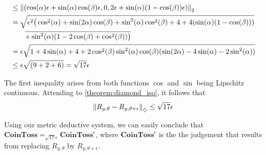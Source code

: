 \begin{example} 
\begin{align*}
  &  \leq \left\lVert ( \cos(\alpha)\epsilon + \sin(\alpha)\cos(\beta) \epsilon, 0, 2\epsilon + \sin(\alpha)(1-\cos(\beta))\epsilon) \right\rVert_{2} \\
  & = \sqrt{\epsilon^2\big(\cos^2(\alpha) +\sin(2\alpha)\cos(\beta) +  \sin^2(\alpha)\cos^2(\beta)+ 4 + 4 (\sin(\alpha) (1-\cos(\beta))) } \\
  & \hspace{20pt} \overline{ + \sin^2(\alpha) (1 - 2\cos(\beta)+ \cos^2(\beta))\big)} \\
  &= \epsilon \sqrt{ 1 + 4 \sin(\alpha)+4+ 2 \cos^2(\beta) \sin^2(\alpha) \cos(\beta)(\sin(2\alpha)-4\sin(\alpha)-2\sin^2(\alpha))} \\
  & \leq \epsilon \sqrt{(9+2+6 )} = \sqrt{17}  \epsilon
\end{align*}

The first inequality arises from both functions $\cos$ and $\sin$ being Lipschitz continuous. Attending to \autoref{theorem:diamond_iso}, it follows that
  \begin{align*}
    \left\lVert R_{y, \theta}- R_{y, \theta + \epsilon}  \right\rVert_{\diamondsuit} \leq \sqrt{17} \epsilon
  \end{align*}

Using our metric deductive system, we can easily conclude that $\textbf{CoinToss} =_{\sqrt{17}  \epsilon} \textbf{CoinToss}^{\epsilon}$, where $\textbf{CoinToss}^{\epsilon}$ is the the judgement that results from replacing $R_{y, \theta}$ by $R_{y, \theta + \epsilon}$.

\end{example}


